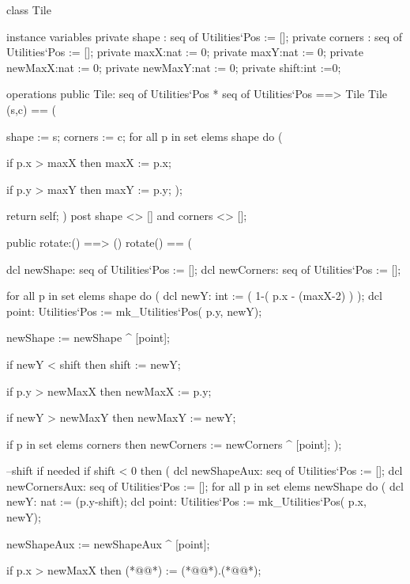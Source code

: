 \begin{vdm_al}
class Tile

 instance variables
  private shape : seq of Utilities`Pos := [];
  private corners : seq of Utilities`Pos := [];
  private maxX:nat := 0;
  private maxY:nat := 0;
  private newMaxX:nat := 0;
  private newMaxY:nat := 0;
  private shift:int :=0;
  
 operations
  public Tile: seq of Utilities`Pos * seq of Utilities`Pos ==> Tile
  Tile (s,c) == (
  
   shape := s;
   corners := c;
   for all p in set elems shape do (
          
                if p.x > maxX then
     maxX := p.x;
     
    if p.y > maxY then
     maxY := p.y;
            );
   
   return self;
  )
  post shape <> [] and corners <> [];
  
        public rotate:() ==> ()
        rotate() == (
        
         dcl newShape: seq of Utilities`Pos := [];
         dcl newCorners: seq of Utilities`Pos := [];
         
         for all p in set elems shape do (
          dcl newY: int := ( 1-( p.x - (maxX-2) ) );
          dcl point: Utilities`Pos := mk_Utilities`Pos( p.y, newY);
          
          newShape := newShape ^ [point];
          
          if newY < shift then
           shift := newY;
          
                if p.y > newMaxX then
     newMaxX := p.y;
     
    if newY > newMaxY then
     newMaxY := newY;
    
    if p in set elems corners then
           newCorners := newCorners ^ [point];
            );
            
            --shift if needed
            if shift < 0 then (
             dcl newShapeAux: seq of Utilities`Pos := [];
          dcl newCornersAux: seq of Utilities`Pos := [];
             for all p in set elems newShape do (
           dcl newY: nat := (p.y-shift);
           dcl point: Utilities`Pos := mk_Utilities`Pos( p.x, newY);
           
           newShapeAux := newShapeAux ^ [point];
           
                 if p.x > newMaxX then
      (*@@*) := (*@@*).(*@@*);
      

\end{vdm_al}
